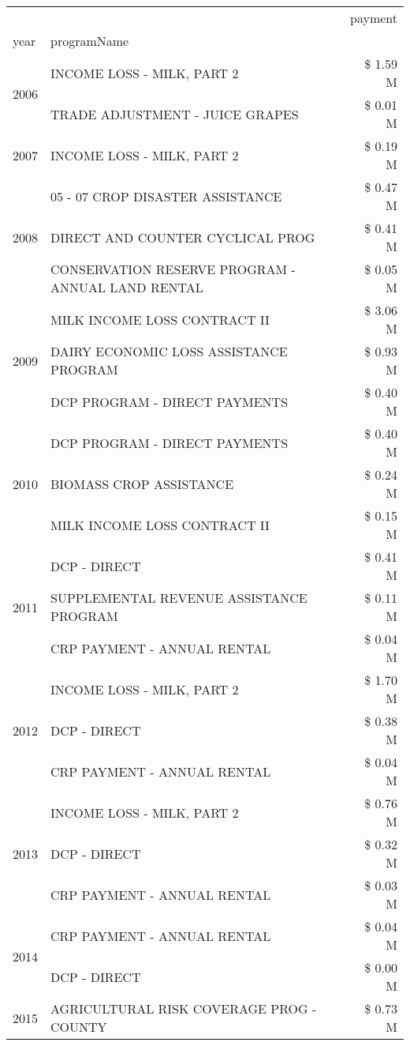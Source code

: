 \begin{tabular}{llr}
\toprule
 &  & payment \\
year & programName &  \\
\midrule
\multirow[t]{2}{*}{2006} & INCOME LOSS - MILK, PART 2 & \$ 1.59 M \\
 & TRADE ADJUSTMENT - JUICE GRAPES & \$ 0.01 M \\
\cline{1-3}
2007 & INCOME LOSS - MILK, PART 2 & \$ 0.19 M \\
\cline{1-3}
\multirow[t]{3}{*}{2008} & 05 - 07 CROP DISASTER ASSISTANCE & \$ 0.47 M \\
 & DIRECT AND COUNTER CYCLICAL PROG & \$ 0.41 M \\
 & CONSERVATION RESERVE PROGRAM - ANNUAL LAND RENTAL & \$ 0.05 M \\
\cline{1-3}
\multirow[t]{3}{*}{2009} & MILK INCOME LOSS CONTRACT II & \$ 3.06 M \\
 & DAIRY ECONOMIC LOSS ASSISTANCE PROGRAM & \$ 0.93 M \\
 & DCP PROGRAM - DIRECT PAYMENTS & \$ 0.40 M \\
\cline{1-3}
\multirow[t]{3}{*}{2010} & DCP PROGRAM - DIRECT PAYMENTS & \$ 0.40 M \\
 & BIOMASS CROP ASSISTANCE & \$ 0.24 M \\
 & MILK INCOME LOSS CONTRACT II & \$ 0.15 M \\
\cline{1-3}
\multirow[t]{3}{*}{2011} & DCP - DIRECT & \$ 0.41 M \\
 & SUPPLEMENTAL REVENUE ASSISTANCE PROGRAM & \$ 0.11 M \\
 & CRP PAYMENT - ANNUAL RENTAL & \$ 0.04 M \\
\cline{1-3}
\multirow[t]{3}{*}{2012} & INCOME LOSS - MILK, PART 2 & \$ 1.70 M \\
 & DCP - DIRECT & \$ 0.38 M \\
 & CRP PAYMENT - ANNUAL RENTAL & \$ 0.04 M \\
\cline{1-3}
\multirow[t]{3}{*}{2013} & INCOME LOSS - MILK, PART 2 & \$ 0.76 M \\
 & DCP - DIRECT & \$ 0.32 M \\
 & CRP PAYMENT - ANNUAL RENTAL & \$ 0.03 M \\
\cline{1-3}
\multirow[t]{2}{*}{2014} & CRP PAYMENT - ANNUAL RENTAL & \$ 0.04 M \\
 & DCP - DIRECT & \$ 0.00 M \\
\cline{1-3}
\multirow[t]{3}{*}{2015} & AGRICULTURAL RISK COVERAGE PROG - COUNTY & \$ 0.73 M \\

\end{tabular}
